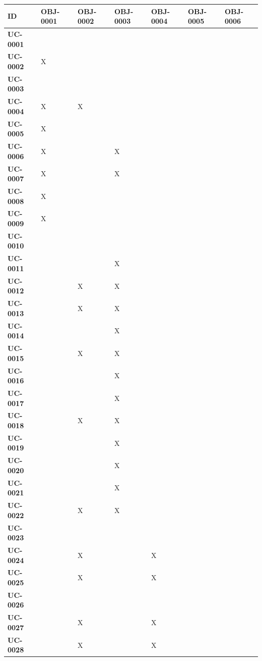 \begin{table}[H]
\centering
\small
\begin{tabular}{|p{2.2cm}|p{2.0cm}|p{2.0cm}|p{2.0cm}|p{2.0cm}|p{2.0cm}|p{2.0cm}|}
\hline
\textbf{ID} & \textbf{OBJ-0001} & \textbf{OBJ-0002} & \textbf{OBJ-0003} & \textbf{OBJ-0004} & \textbf{OBJ-0005} & \textbf{OBJ-0006} \\
\hline
\hline
\textbf{UC-0001} & & & & & & \\
\hline
\textbf{UC-0002} & X & & & & & \\
\hline
\textbf{UC-0003} & & & & & & \\
\hline
\textbf{UC-0004} & X & X & & & & \\
\hline
\textbf{UC-0005} & X & & & & & \\
\hline
\textbf{UC-0006} & X & & X & & & \\
\hline
\textbf{UC-0007} & X & & X & & & \\
\hline
\textbf{UC-0008} & X & & & & & \\
\hline
\textbf{UC-0009} & X & & & & & \\
\hline
\textbf{UC-0010} & & & & & & \\
\hline
\textbf{UC-0011} & & & X & & & \\
\hline
\textbf{UC-0012} & & X & X & & & \\
\hline
\textbf{UC-0013} & & X & X & & & \\
\hline
\textbf{UC-0014} & & & X & & & \\
\hline
\textbf{UC-0015} & & X & X & & & \\
\hline
\textbf{UC-0016} & & & X & & & \\
\hline
\textbf{UC-0017} & & & X & & & \\
\hline
\textbf{UC-0018} & & X & X & & & \\
\hline
\textbf{UC-0019} & & & X & & & \\
\hline
\textbf{UC-0020} & & & X & & & \\
\hline
\textbf{UC-0021} & & & X & & & \\
\hline
\textbf{UC-0022} & & X & X & & & \\
\hline
\textbf{UC-0023} & & & & & & \\
\hline
\textbf{UC-0024} & & X & & X & & \\
\hline
\textbf{UC-0025} & & X & & X & & \\
\hline
\textbf{UC-0026} & & & & & & \\
\hline
\textbf{UC-0027} & & X & & X & & \\
\hline
\textbf{UC-0028} & & X & & X & & \\

\end{tabular}
\end{table}
